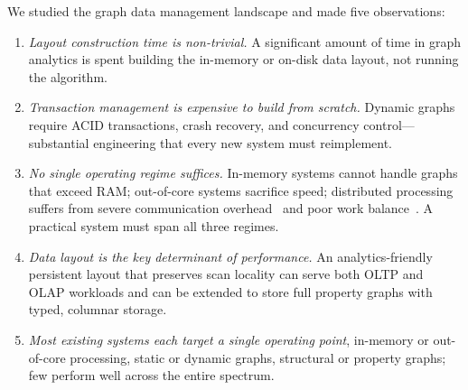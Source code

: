 We studied the graph data management landscape and made five observations:
\begin{enumerate}
  \item \textit{Layout construction time is non-trivial.} A significant amount of time in graph analytics is spent building the in-memory or on-disk data layout, not running the algorithm.
  \item \textit{Transaction management is expensive to build from scratch.} Dynamic graphs require ACID transactions, crash recovery, and concurrency control---substantial engineering that every new system must reimplement.
  \item \textit{No single operating regime suffices.} In-memory systems cannot handle graphs that exceed RAM; out-of-core systems sacrifice speed; distributed processing suffers from severe communication overhead~\cite{mcsherry2015scalability,beamer2016understanding} and poor work balance~\cite{hajidehi2023cuttana}. A practical system must span all three regimes.
  \item \textit{Data layout is the key determinant of performance.} An analytics-friendly persistent layout that preserves scan locality can serve both OLTP and OLAP workloads and can be extended to store full property graphs with typed, columnar storage.
  \item \textit{Most existing systems each target a single operating point}, in-memory or out-of-core processing, static or dynamic graphs, structural or property graphs; few perform well across the entire spectrum.
\end{enumerate}


